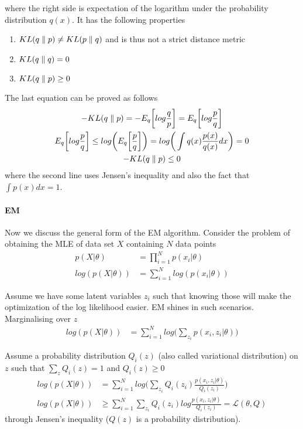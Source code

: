 \documentclass[../../statistical_learning_notes.tex]{subfiles}
\begin{document}
where the right side is expectation of the logarithm under the probability distribution $q(x)$. It has the following properties
\begin{enumerate}
    \item $KL(q \parallel p) \neq KL(p \parallel q)$ and is thus not a strict distance metric
    \item $KL(q \parallel q) = 0$
    \item $KL(q \parallel p) \geq 0$
\end{enumerate}
The last equation can be proved as follows
\begin{gather*}
    -KL(q \parallel p) = -E_{q} \bigg[log \frac{q}{p} \bigg] = E_{q} \bigg[log \frac{p}{q} \bigg]\\
    E_{q}\bigg[ log\frac{p}{q} \bigg] \leq log \bigg( E_{q} \bigg[\frac{p}{q} \bigg] \bigg) = log \bigg(\int q(x) \frac{p(x)}{q(x)} dx \bigg) = 0\\
    -KL(q \parallel p) \leq 0\\
\end{gather*}
where the second line uses Jensen's inequality and also the fact that $\int p(x) dx = 1$.


\paragraph{EM} Now we discuss the general form of the EM algorithm. Consider the problem of obtaining the MLE of data set $X$ containing $N$ data points
\begin{align*}
    p(X|\theta) &= \prod_{i=1}^{N} p(x_{i}|\theta)\\
    log(p(X|\theta)) &= \sum_{i=1}^{N} log(p(x_{i}|\theta))
\end{align*}

Assume we have some latent variables $z_{i}$ such that knowing those will make the optimization of the log likelihood easier. EM shines in such scenarios. Marginalising over $z$
\begin{align*}
    log(p(X|\theta)) &= \sum_{i=1}^{N} log \bigg(\sum_{z_{i}} p(x_{i}, z_{i}|\theta) \bigg)
\end{align*}

Assume a probability distribution $Q_{i}(z)$ (also called variational distribution) on $z$ such that $\sum_{z} Q_{i}(z) = 1$ and $Q_{i}(z) \geq 0$
\begin{align*}
    log(p(X|\theta)) &= \sum_{i=1}^{N} log \bigg( \sum_{z_{i}} Q_{i}(z_{i}) \frac{p(x_{i}, z_{i}|\theta)}{Q_{i}(z_{i})} \bigg)\\
    log(p(X|\theta)) &\geq \sum_{i=1}^{N} \sum_{z_{i}} Q_{i}(z_{i}) log \frac{p(x_{i}, z_{i}|\theta)}{Q_{i}(z_{i})} = \mathcal{L}(\theta, Q)
\end{align*}
through Jensen's inequality ($Q(z)$ is a probability distribution).\newline
\end{document}
